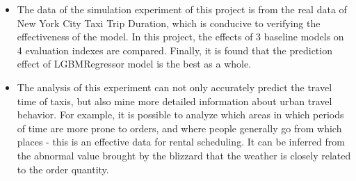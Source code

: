 \documentclass{tikzposter} %
\begin{document}
\begin{columns}
{\vspace{.5cm}

   

}


{
\begin{itemize}
    \item
   The data of the simulation experiment of this project is from the real data of New York City Taxi Trip Duration, which is conducive to verifying the effectiveness of the model. In this project, the effects of 3 baseline models on 4 evaluation indexes are compared. Finally, it is found that the prediction effect of LGBMRegressor model is the best as a whole.

    \item
   The analysis of this experiment can not only accurately predict the travel time of taxis, but also mine more detailed information about urban travel behavior. For example, it is possible to analyze which areas in which periods of time are more prone to orders, and where people generally go from which places - this is an effective data for rental scheduling. It can be inferred from the abnormal value brought by the blizzard that the weather is closely related to the order quantity. 

    
    
\end{itemize}


}





\end{columns}
\end{document}
